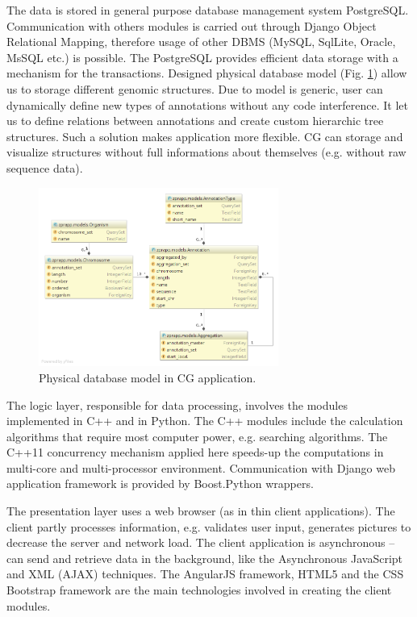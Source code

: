 \documentclass[]{spie}
\newcommand{\appShortcut}{CG}
\begin{document}
The data is stored in general purpose database management system PostgreSQL.
Communication with others modules is carried out through Django Object Relational Mapping,
therefore usage of other DBMS (MySQL, SqlLite, Oracle, MsSQL etc.) is possible.
The PostgreSQL provides efficient data storage with a mechanism for the transactions.
Designed physical database model (Fig. \ref{fig:db_model}) allow us to storage different genomic structures.
Due to model is generic, user can dynamically define new types of annotations without any code interference.
It let us to define relations between annotations and create custom hierarchic tree structures. Such a solution makes application more flexible.
\appShortcut{} can storage and visualize structures without full informations about themselves (e.g. without raw sequence data).

\begin{figure}[htp]
	\centering
	\includegraphics[width=0.7\textwidth]{img/db_model.png}
	\caption{Physical database model in \appShortcut{} application.}
	\label{fig:db_model}
\end{figure}

The logic layer, responsible for data processing, involves the modules implemented in C++ and in Python.
The C++ modules include the calculation algorithms that require most computer power,
e.g. searching algorithms.
The C++11 concurrency mechanism applied here speeds-up the computations in multi-core and multi-processor environment.
Communication with Django web application framework is provided by Boost.Python wrappers.

The presentation layer uses a web browser (as in thin client applications).
The client partly processes information, e.g. validates user input, generates pictures to decrease the server and network load.
The client application is asynchronous -- can send and retrieve data in the background, like the Asynchronous JavaScript and XML (AJAX) techniques.
The AngularJS framework, HTML5 and the CSS Bootstrap framework are the main technologies involved in creating the client modules.
\end{document}
